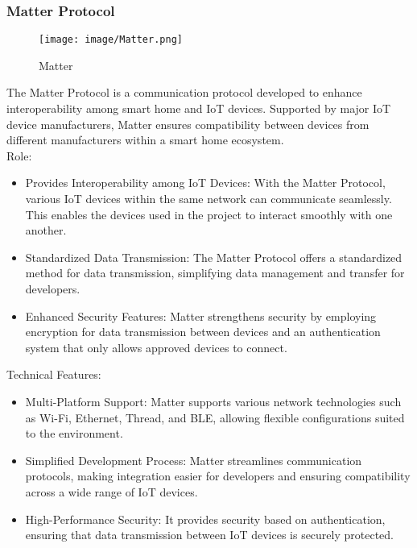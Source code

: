 \documentclass[conference]{IEEEtran}
\begin{document}
\subsubsection{Matter Protocol}
\begin{figure}[h!]
    \centering
    \texttt{[image: image/Matter.png]}
    \caption{Matter}
    \label{fig:enter-label}
\end{figure}
\noindent The Matter Protocol is a communication protocol developed to enhance interoperability among smart home and IoT devices. Supported by major IoT device manufacturers, Matter ensures compatibility between devices from different manufacturers within a smart home ecosystem.\\

Role:
\begin{itemize}
    \item Provides Interoperability among IoT Devices: With the Matter Protocol, various IoT devices within the same network can communicate seamlessly. This enables the devices used in the project to interact smoothly with one another.\\
    \item Standardized Data Transmission: The Matter Protocol offers a standardized method for data transmission, simplifying data management and transfer for developers.\\
    \item Enhanced Security Features: Matter strengthens security by employing encryption for data transmission between devices and an authentication system that only allows approved devices to connect.\\
\end{itemize}

Technical Features:
\begin{itemize}
    \item Multi-Platform Support: Matter supports various network technologies such as Wi-Fi, Ethernet, Thread, and BLE, allowing flexible configurations suited to the environment.\\
    \item Simplified Development Process: Matter streamlines communication protocols, making integration easier for developers and ensuring compatibility across a wide range of IoT devices.
    \item High-Performance Security: It provides security based on authentication, ensuring that data transmission between IoT devices is securely protected.\\
\end{itemize}
\end{document}
